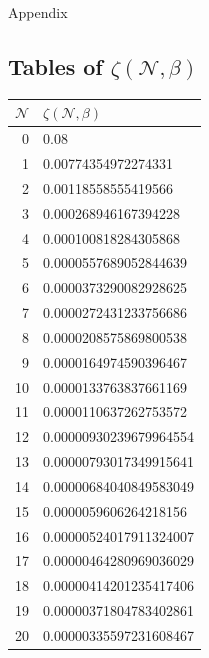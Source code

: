 \documentclass[12pt]{article}
\newcommand{\enterProblemHeader}[1]{
	\rhead{#1}
}
\newenvironment{main_section}[1]{
	\section{#1}
	\enterProblemHeader{#1}
}{
	\pagebreak
}
\begin{document}
\begin{main_section}{Appendix}
	\subsection{Tables of $\zeta(\mathcal N, \beta)$}
	\begin{center}
	\begin{tabular}{r|l}
		$\mathcal N$ & $\zeta(\mathcal N, \beta)$\\
		\hline
		 0&    0.08                \\
		 1&    0.00774354972274331 \\
		 2&    0.00118558555419566 \\
		 3&    0.000268946167394228\\
		 4&    0.000100818284305868\\
		 5&    0.0000557689052844639\\
		 6&    0.0000373290082928625\\
		 7&    0.0000272431233756686\\
		 8&    0.0000208575869800538\\
		 9&    0.0000164974590396467\\
		10&    0.0000133763837661169\\
		11&    0.0000110637262753572\\
		12&    0.00000930239679964554\\
		13&    0.00000793017349915641\\
		14&    0.00000684040849583049\\
		15&    0.0000059606264218156\\
		16&    0.00000524017911324007\\
		17&    0.00000464280969036029\\
		18&    0.00000414201235417406\\
		19&    0.00000371804783402861\\
		20&    0.00000335597231608467\\
	\end{tabular}
	\end{center}
\end{main_section}
\end{document}
